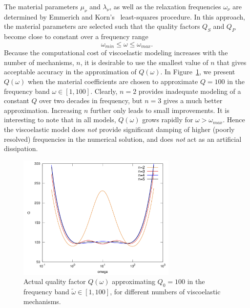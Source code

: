\documentclass[11pt]{report}
\begin{document}
The material parameters $\mu_\nu$ and $\lambda_{\nu}$, as well as the relaxation frequencies
$\omega_\nu$ are determined by Emmerich and Korn's~\cite{Emm-Korn-87} least-squares procedure. In
this approach, the material parameters are selected such that the quality factors $Q_S$ and $Q_P$ become close to constant
over a frequency range
\[
\omega_{min}\leq \omega \leq \omega_{max}.
\]
Because the computational cost of viscoelastic modeling increases with the number of mechanisms,
$n$, it is desirable to use the smallest value of $n$ that gives acceptable accuracy in the
approximation of $Q(\omega)$. In Figure~\ref{fig:q2-5}, we present $Q(\omega)$ when the material
coefficients are chosen to approximate $Q=100$ in the frequency band $\omega\in[1,100]$. Clearly,
$n=2$ provides inadequate modeling of a constant $Q$ over two decades in frequency, but $n= 3$ gives
a much better approximation. Increasing $n$ further only leads to small improvements. It is
interesting to note that in all models, $Q(\omega)$ grows rapidly for $\omega>\omega_{max}$. Hence
the viscoelastic model does {\em not} provide significant damping of higher (poorly resolved)
frequencies in the numerical solution, and does {\em not} act as an artificial dissipation.
\begin{figure}
\begin{centering}
\includegraphics[width=0.7\textwidth]{figures/q2-5.png}
\caption{Actual quality factor $Q(\omega)$ approximating $Q_0=100$ in the frequency band
  $\tilde\omega\in[1,100]$, for different numbers of viscoelastic mechanisms.}
\label{fig:q2-5}
\end{centering}
\end{figure}
\end{document}

